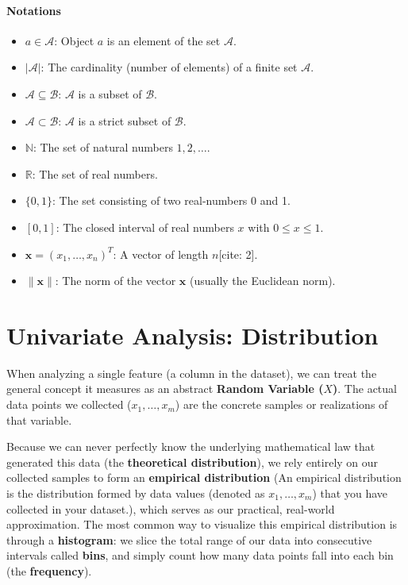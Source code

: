 \paragraph*{Notations}
\begin{itemize}
    \item $a \in \mathcal{A}$: Object $a$ is an element of the set $\mathcal{A}$.
    \item $|\mathcal{A}|$: The cardinality (number of elements) of a finite set $\mathcal{A}$.
    \item $\mathcal{A} \subseteq \mathcal{B}$: $\mathcal{A}$ is a subset of $\mathcal{B}$.
    \item $\mathcal{A} \subset \mathcal{B}$: $\mathcal{A}$ is a strict subset of $\mathcal{B}$.
    \item $\mathbb{N}$: The set of natural numbers $1, 2, \dots$.
    \item $\mathbb{R}$: The set of real numbers.
    \item $\{0, 1\}$: The set consisting of two real-numbers 0 and 1.
    \item $[0, 1]$: The closed interval of real numbers $x$ with $0 \le x \le 1$.
    \item $\mathbf{x} = (x_1, \dots, x_n)^T$: A vector of length $n$[cite: 2].
    \item $\|\mathbf{x}\|$: The norm of the vector $\mathbf{x}$ (usually the Euclidean norm).
\end{itemize}

\section{Univariate Analysis: Distribution}
When analyzing a single feature (a column in the dataset), we can treat the general concept it measures as an abstract \textbf{Random Variable ($X$)}. The actual data points we collected ($x_1, \dots, x_m$) are the concrete samples or realizations of that variable. 

Because we can never perfectly know the underlying mathematical law that generated this data (the \textbf{theoretical distribution}), we rely entirely on our collected samples to form an \textbf{empirical distribution} (An empirical distribution is the distribution formed by data values (denoted as $x_1, \dots, x_m$) that you have collected in your dataset.), which serves as our practical, real-world approximation. The most common way to visualize this empirical distribution is through a \textbf{histogram}: we slice the total range of our data into consecutive intervals called \textbf{bins}, and simply count how many data points fall into each bin (the \textbf{frequency}).

